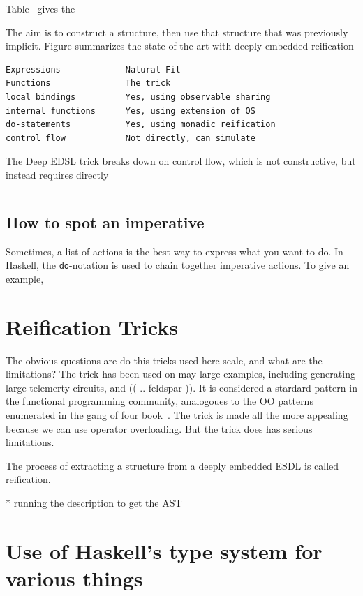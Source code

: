 \documentclass[11pt]{article}
\newcommand{\cursor}{%
\begin{center}
\marginpar{\vskip 4pt\sc Cursor}
\begin{tabular*}{\linewidth}{c}
\hline
\end{tabular*}
\end{center}
}
\begin{document}
Table~\cite{tab:status} gives the 


The aim is to construct a structure, then
use that structure that was previously implicit.
Figure summarizes the state of the art with
deeply embedded reification

\begin{verbatim}
Expressions             Natural Fit
Functions               The trick
local bindings          Yes, using observable sharing
internal functions      Yes, using extension of OS
do-statements           Yes, using monadic reification
control flow            Not directly, can simulate
\end{verbatim}

The Deep EDSL trick breaks down on control flow,
which is not constructive, but instead requires
directly 

\cursor{}

\subsection{How to spot an imperative}

Sometimes, a list of actions is the best way to express what you want to do.
In Haskell, the \verb|do|-notation is used to chain together imperative actions.
To give an example, 

\section{Reification Tricks}

The obvious questions are do this tricks used here scale,
and what are the limitations? The trick has
been used on may large examples, including
generating large telemerty circuits, 
and (( .. feldspar )). It is considered a
stardard pattern in the functional programming
community, analogoues to the OO patterns
enumerated in the gang of four book~\cite{..}.
The trick is made all the more appealing
because we can use operator overloading.
But the trick does has serious limitations.



The process of extracting a structure from a deeply embedded ESDL
is called reification. 

 * running the description to get the AST 

\section{Use of Haskell’s type system for various things }
\end{document}
